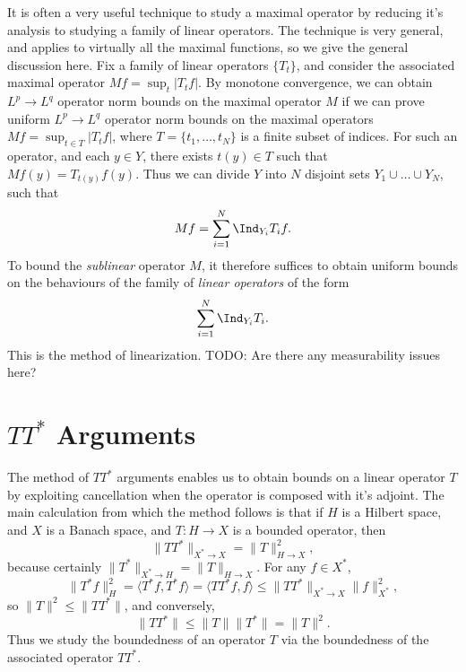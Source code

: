 It is often a very useful technique to study a maximal operator by reducing it's analysis to studying a family of linear operators. The technique is very general, and applies to virtually all the maximal functions, so we give the general discussion here. Fix a family of linear operators $\{ T_t \}$, and consider the associated maximal operator $Mf = \sup_t |T_t f|$. By monotone convergence, we can obtain $L^p \to L^q$ operator norm bounds on the maximal operator $M$ if we can prove uniform $L^p \to L^q$ operator norm bounds on the maximal operators $Mf = \sup_{t \in T} |T_t f|$, where $T = \{ t_1, \dots, t_N \}$ is a finite subset of indices. For such an operator, and each $y \in Y$, there exists $t(y) \in T$ such that $Mf(y) = T_{t(y)} f(y)$. Thus we can divide $Y$ into $N$ disjoint sets $Y_1 \cup \dots \cup Y_N$, such that
%
\[ Mf = \sum_{i = 1}^N \Ind_{Y_i} T_i f. \]
%
To bound the \emph{sublinear} operator $M$, it therefore suffices to obtain uniform bounds on the behaviours of the family of \emph{linear operators} of the form
%
\[ \sum_{i = 1}^N \Ind_{Y_i} T_i. \]
%
This is the method of linearization. TODO: Are there any measurability issues here?

\section{$TT^*$ Arguments}

The method of $TT^*$ arguments enables us to obtain bounds on a linear operator $T$ by exploiting cancellation when the operator is composed with it's adjoint. The main calculation from which the method follows is that if $H$ is a Hilbert space, and $X$ is a Banach space, and $T: H \to X$ is a bounded operator, then
%
\[ \| T T^* \|_{X^* \to X} = \| T \|_{H \to X}^2, \]
%
because certainly $\| T^* \|_{X^* \to H} = \| T \|_{H \to X}$. For any $f \in X^*$,
%
\[ \| T^* f \|_H^2 = \langle T^* f, T^* f \rangle = \langle TT^* f, f \rangle \leq \| TT^* \|_{X^* \to X} \| f \|_{X^*}^2, \]
%
so $\| T \|^2 \leq \| TT^* \|$, and conversely,
%
\[ \| TT^* \| \leq \| T \| \| T^* \| = \| T \|^2. \]
%
Thus we study the boundedness of an operator $T$ via the boundedness of the associated operator $TT^*$.

